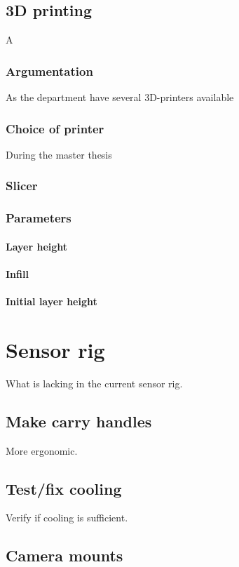 \section{3D printing}
A

\subsection{Argumentation}
As the department have several 3D-printers available


\subsection{Choice of printer}
During the master thesis

\subsection{Slicer}

\subsection{Parameters}
\subsubsection{Layer height}
\subsubsection{Infill}
\subsubsection{Initial layer height}

\chapter{Sensor rig}
What is lacking in the current sensor rig.


\section{Make carry handles}
More ergonomic.

\section{Test/fix cooling}
Verify if cooling is sufficient.

\section{Camera mounts}

